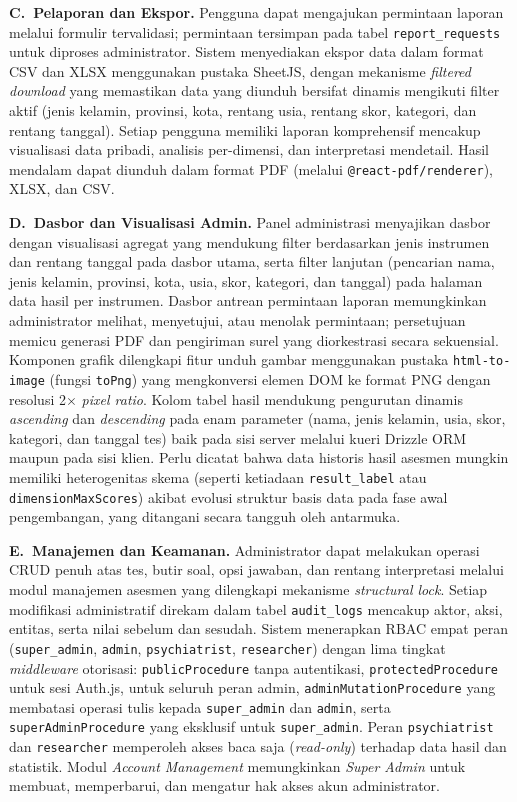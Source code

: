 \textbf{C.~Pelaporan dan Ekspor.}
Pengguna dapat mengajukan permintaan laporan melalui formulir tervalidasi; permintaan tersimpan pada tabel \texttt{report\_requests} untuk diproses administrator. Sistem menyediakan ekspor data dalam format CSV dan XLSX menggunakan pustaka SheetJS, dengan mekanisme \textit{filtered download} yang memastikan data yang diunduh bersifat dinamis mengikuti filter aktif (jenis kelamin, provinsi, kota, rentang usia, rentang skor, kategori, dan rentang tanggal). Setiap pengguna memiliki laporan komprehensif mencakup visualisasi data pribadi, analisis per-dimensi, dan interpretasi mendetail. Hasil mendalam dapat diunduh dalam format PDF (melalui \texttt{@react-pdf/renderer}), XLSX, dan CSV.

\textbf{D.~Dasbor dan Visualisasi Admin.}
Panel administrasi menyajikan dasbor dengan visualisasi agregat yang mendukung filter berdasarkan jenis instrumen dan rentang tanggal pada dasbor utama, serta filter lanjutan (pencarian nama, jenis kelamin, provinsi, kota, usia, skor, kategori, dan tanggal) pada halaman data hasil per instrumen. Dasbor antrean permintaan laporan memungkinkan administrator melihat, menyetujui, atau menolak permintaan; persetujuan memicu generasi PDF dan pengiriman surel yang diorkestrasi secara sekuensial. Komponen grafik dilengkapi fitur unduh gambar menggunakan pustaka \texttt{html-to-image} (fungsi \texttt{toPng}) yang mengkonversi elemen DOM ke format PNG dengan resolusi 2$\times$ \textit{pixel ratio}. Kolom tabel hasil mendukung pengurutan dinamis \textit{ascending} dan \textit{descending} pada enam parameter (nama, jenis kelamin, usia, skor, kategori, dan tanggal tes) baik pada sisi server melalui kueri Drizzle ORM maupun pada sisi klien. Perlu dicatat bahwa data historis hasil asesmen mungkin memiliki heterogenitas skema (seperti ketiadaan \texttt{result\_label} atau \texttt{dimensionMaxScores}) akibat evolusi struktur basis data pada fase awal pengembangan, yang ditangani secara tangguh oleh antarmuka.

\textbf{E.~Manajemen dan Keamanan.}
Administrator dapat melakukan operasi CRUD penuh atas tes, butir soal, opsi jawaban, dan rentang interpretasi melalui modul manajemen asesmen yang dilengkapi mekanisme \textit{structural lock}. Setiap modifikasi administratif direkam dalam tabel \texttt{audit\_logs} mencakup aktor, aksi, entitas, serta nilai sebelum dan sesudah. Sistem menerapkan RBAC empat peran (\texttt{super\_admin}, \texttt{admin}, \texttt{psychiatrist}, \texttt{researcher}) dengan lima tingkat \textit{middleware} otorisasi: \texttt{publicProcedure} tanpa autentikasi, \texttt{protectedProcedure} untuk sesi Auth.js, \texttt{} untuk seluruh peran admin, \texttt{adminMutationProcedure} yang membatasi operasi tulis kepada \texttt{super\_admin} dan \texttt{admin}, serta \texttt{superAdminProcedure} yang eksklusif untuk \texttt{super\_admin}. Peran \texttt{psychiatrist} dan \texttt{researcher} memperoleh akses baca saja (\textit{read-only}) terhadap data hasil dan statistik. Modul \textit{Account Management} memungkinkan \textit{Super Admin} untuk membuat, memperbarui, dan mengatur hak akses akun administrator.

